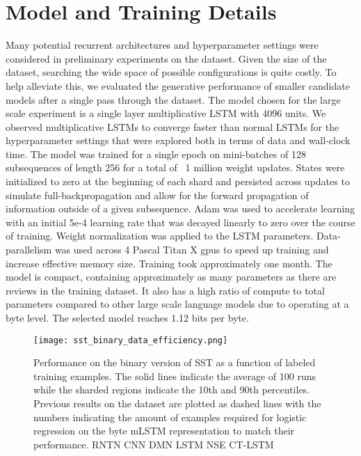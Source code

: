 \documentclass{article}
\begin{document}
\section{Model and Training Details}
Many potential recurrent architectures and hyperparameter settings were considered in preliminary experiments on the dataset. Given the size of the dataset, searching the wide space of possible configurations is quite costly. To help alleviate this, we evaluated the generative performance of smaller candidate models after a single pass through the dataset. The model chosen for the large scale experiment is a single layer multiplicative LSTM \cite{krause2016multiplicative} with 4096 units. We observed multiplicative LSTMs to converge faster than normal LSTMs for the hyperparameter settings that were explored both in terms of data and wall-clock time. The model was trained for a single epoch on mini-batches of 128 subsequences of length 256 for a total of ~1 million weight updates. States were initialized to zero at the beginning of each shard and persisted across updates to simulate full-backpropagation and allow for the forward propagation of information outside of a given subsequence. Adam \cite{kingma2014adam} was used to accelerate learning with an initial 5e-4 learning rate that was decayed linearly to zero over the course of training. Weight normalization \cite{salimans2016weight} was applied to the LSTM parameters. Data-parallelism was used across 4 Pascal Titan X gpus to speed up training and increase effective memory size. Training took approximately one month. The model is compact, containing approximately as many parameters as there are reviews in the training dataset. It also has a high ratio of compute to total parameters compared to other large scale language models due to operating at a byte level. The selected model reaches 1.12 bits per byte.

\begin{figure}[h]
\vskip 0.2in
\begin{center}
\centerline{\texttt{[image: sst\_binary\_data\_efficiency.png]}}
\caption{Performance on the binary version of SST as a function of labeled training examples. The solid lines indicate the average of 100 runs while the sharded regions indicate the 10th and 90th percentiles. Previous results on the dataset are plotted as dashed lines with the numbers indicating the amount of examples required for logistic regression on the byte mLSTM representation to match their performance. RNTN \cite{socher2013recursive} CNN \cite{kim2014convolutional} DMN \cite{kumar2015ask} LSTM \cite{wieting2015towards} NSE \cite{munkhdalai2016neural} CT-LSTM \cite{looks2017deep}}
\label{sst binary performance}
\end{center}
\vskip -0.2in
\end{figure} 
\end{document}
